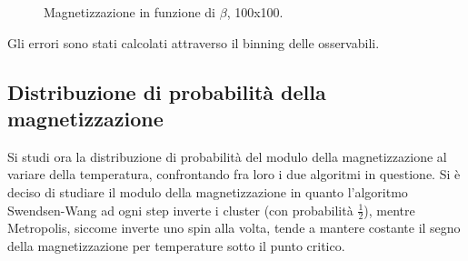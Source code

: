 \begin{figure}[h]
\caption{Magnetizzazione in funzione di $\beta$, 100x100.}

\end{figure}

Gli errori sono stati calcolati attraverso il binning delle osservabili.
\subsection{Distribuzione di probabilità della magnetizzazione}
Si studi ora la distribuzione di probabilità del modulo della magnetizzazione al variare della temperatura, confrontando fra loro i due algoritmi in questione.
Si è deciso di studiare il modulo della magnetizzazione in quanto l'algoritmo Swendsen-Wang ad ogni step inverte i cluster (con probabilità $\frac{1}{2}$), mentre Metropolis, siccome inverte uno spin alla volta, tende a mantere costante il segno della magnetizzazione per temperature sotto il punto critico.


